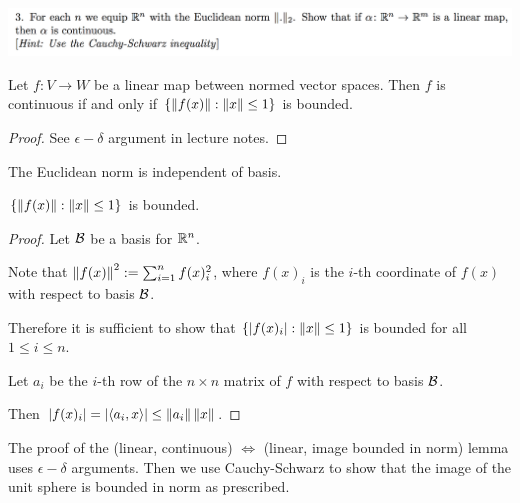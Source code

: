 \documentclass[12pt]{article}
\begin{document}
\newpage
\subsection{}
\begin{mdframed}
\includegraphics[width=400pt]{img/oxford-a2-1-3.png}
\end{mdframed}

\begin{lemma*}
  Let $f:V \to W$ be a linear map between normed vector spaces. Then $f$ is continuous if and only
  if $\{\left\Vert f(x) \right\Vert : \left\Vert x \right\Vert \leq 1\}$ is bounded.
\end{lemma*}

\begin{proof}
  See $\epsilon-\delta$ argument in lecture notes.
\end{proof}

\begin{claim*}
  The Euclidean norm is independent of basis.
\end{claim*}

\begin{claim*}
  $\{\left\Vert f(x) \right\Vert : \left\Vert x \right\Vert \leq 1\}$ is bounded. 
\end{claim*}

\begin{proof}
Let $\mathcal B$ be a basis for $\mathbb{R}^n$.

Note that $\left\Vert f(x) \right\Vert^2 := \sum_{i=1}^n f(x)_i^2$, where $f(x)_i$ is the $i$-th coordinate of
$f(x)$ with respect to basis $\mathcal B$.

Therefore it is sufficient to show that $\{|f(x)_i| : \left\Vert x \right\Vert \leq 1\}$ is bounded for all
$1 \leq i \leq n$.

Let $a_i$ be the $i$-th row of the $n \times n$ matrix of $f$ with respect to basis $\mathcal B$.

Then $|f(x)_i| = |\langle a_i, x \rangle| \leq \left\Vert a_i \right\Vert\left\Vert x \right\Vert$.
\end{proof}

\begin{intuition*}
  The proof of the (linear, continuous) $\iff$ (linear, image bounded in norm) lemma uses
  $\epsilon-\delta$ arguments. Then we use Cauchy-Schwarz to show that the image of the unit sphere
  is bounded in norm as prescribed.
\end{intuition*}
\end{document}
